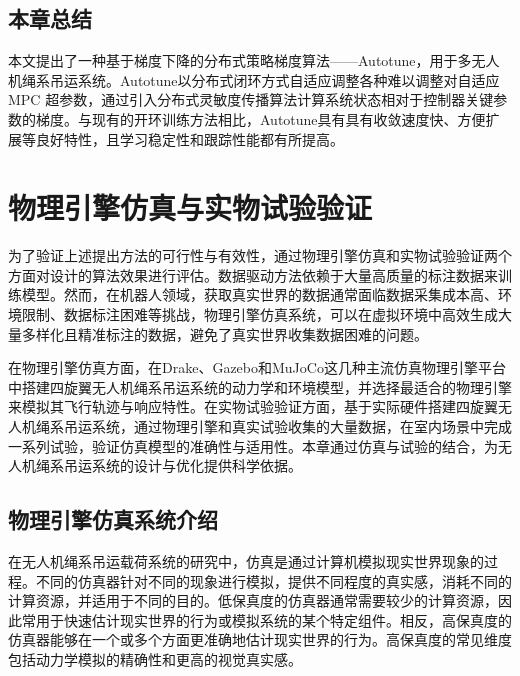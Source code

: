 \documentclass[lang=chs, degree=master, blindreview=true, winfonts=true]{yanputhesis}
\begin{document}


\section{本章总结}
本文提出了一种基于梯度下降的分布式策略梯度算法——Autotune，用于多无人机绳系吊运系统。Autotune以分布式闭环方式自适应调整各种难以调整对自适应 MPC 超参数，通过引入分布式灵敏度传播算法计算系统状态相对于控制器关键参数的梯度。与现有的开环训练方法相比，Autotune具有具有收敛速度快、方便扩展等良好特性，且学习稳定性和跟踪性能都有所提高。


\cleardoublepage

\chapter{物理引擎仿真与实物试验验证}
为了验证上述提出方法的可行性与有效性，通过物理引擎仿真和实物试验验证两个方面对设计的算法效果进行评估。数据驱动方法依赖于大量高质量的标注数据来训练模型。然而，在机器人领域，获取真实世界的数据通常面临数据采集成本高、环境限制、数据标注困难等挑战，物理引擎仿真系统，可以在虚拟环境中高效生成大量多样化且精准标注的数据，避免了真实世界收集数据困难的问题。

在物理引擎仿真方面，在Drake、Gazebo和MuJoCo这几种主流仿真物理引擎平台中搭建四旋翼无人机绳系吊运系统的动力学和环境模型，并选择最适合的物理引擎来模拟其飞行轨迹与响应特性。在实物试验验证方面，基于实际硬件搭建四旋翼无人机绳系吊运系统，通过物理引擎和真实试验收集的大量数据，在室内场景中完成一系列试验，验证仿真模型的准确性与适用性。本章通过仿真与试验的结合，为无人机绳系吊运系统的设计与优化提供科学依据。
\section{物理引擎仿真系统介绍}
在无人机绳系吊运载荷系统的研究中，仿真是通过计算机模拟现实世界现象的过程。不同的仿真器针对不同的现象进行模拟，提供不同程度的真实感，消耗不同的计算资源，并适用于不同的目的。低保真度的仿真器通常需要较少的计算资源，因此常用于快速估计现实世界的行为或模拟系统的某个特定组件。相反，高保真度的仿真器能够在一个或多个方面更准确地估计现实世界的行为。高保真度的常见维度包括动力学模拟的精确性和更高的视觉真实感。
\end{document}
